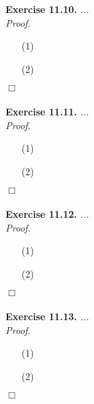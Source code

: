 \documentclass{article}
\begin{document}



\textbf{Exercise 11.10.}
\emph{...} \\

\emph{Proof.}
\begin{enumerate}
\item[(1)]
\item[(2)]

\end{enumerate}
$\Box$ \\\\






\textbf{Exercise 11.11.}
\emph{...} \\

\emph{Proof.}
\begin{enumerate}
\item[(1)]
\item[(2)]

\end{enumerate}
$\Box$ \\\\






\textbf{Exercise 11.12.}
\emph{...} \\

\emph{Proof.}
\begin{enumerate}
\item[(1)]
\item[(2)]

\end{enumerate}
$\Box$ \\\\






\textbf{Exercise 11.13.}
\emph{...} \\

\emph{Proof.}
\begin{enumerate}
\item[(1)]
\item[(2)]

\end{enumerate}
$\Box$ \\\\
\end{document}
